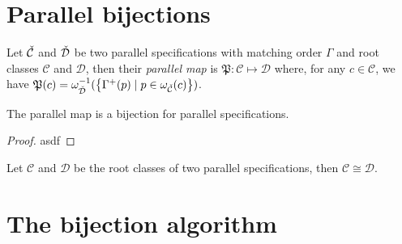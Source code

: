 \section{Parallel bijections}
\begin{definition}
Let $\check{\mathcal{C}}$ and $\check{\mathcal{D}}$ be two parallel specifications with matching order $\Gamma$ and root classes $\mathcal{C}$ and $\mathcal{D}$, then their \emph{parallel map} is
$\mathfrak{P}: \mathcal{C} \mapsto \mathcal{D}$ where, for any $c \in \mathcal{C}$, we have
$\mathfrak{P}(c) = \omega_{\check{\mathcal{D}}}^{-1}(\left\{\Gamma^+(p) \mid p \in \omega_{\check{\mathcal{C}}}(c)\right\})$.
\end{definition}
\begin{proposition}
The parallel map is a bijection for parallel specifications.
\end{proposition}
\begin{proof}
asdf
\end{proof}
\begin{corollary}
Let $\mathcal{C}$ and $\mathcal{D}$ be the root classes of two parallel specifications, then $\mathcal{C} \cong \mathcal{D}$.
\end{corollary}

\section{The bijection algorithm}
